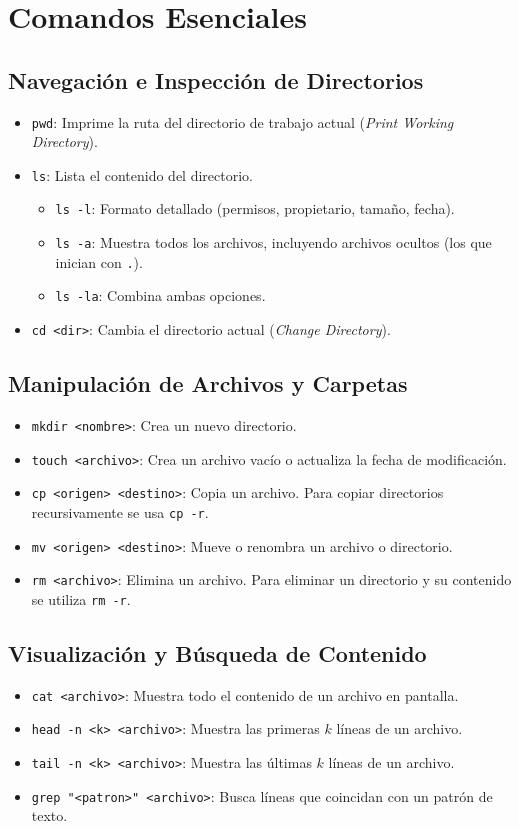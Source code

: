 \documentclass[12pt,a4paper]{article}
\begin{document}
\section{Comandos Esenciales}

\subsection{Navegación e Inspección de Directorios}
\begin{itemize}
    \item \texttt{pwd}: Imprime la ruta del directorio de trabajo actual (\textit{Print Working Directory}).
    \item \texttt{ls}: Lista el contenido del directorio.
    \begin{itemize}
        \item \texttt{ls -l}: Formato detallado (permisos, propietario, tamaño, fecha).
        \item \texttt{ls -a}: Muestra todos los archivos, incluyendo archivos ocultos (los que inician con \texttt{.}).
        \item \texttt{ls -la}: Combina ambas opciones.
    \end{itemize}
    \item \texttt{cd <dir>}: Cambia el directorio actual (\textit{Change Directory}).
\end{itemize}

\subsection{Manipulación de Archivos y Carpetas}
\begin{itemize}
    \item \texttt{mkdir <nombre>}: Crea un nuevo directorio.
    \item \texttt{touch <archivo>}: Crea un archivo vacío o actualiza la fecha de modificación.
    \item \texttt{cp <origen> <destino>}: Copia un archivo. Para copiar directorios recursivamente se usa \texttt{cp -r}.
    \item \texttt{mv <origen> <destino>}: Mueve o renombra un archivo o directorio.
    \item \texttt{rm <archivo>}: Elimina un archivo. Para eliminar un directorio y su contenido se utiliza \texttt{rm -r}.
\end{itemize}

\subsection{Visualización y Búsqueda de Contenido}
\begin{itemize}
    \item \texttt{cat <archivo>}: Muestra todo el contenido de un archivo en pantalla.
    \item \texttt{head -n <k> <archivo>}: Muestra las primeras $k$ líneas de un archivo.
    \item \texttt{tail -n <k> <archivo>}: Muestra las últimas $k$ líneas de un archivo.
    \item \texttt{grep "<patron>" <archivo>}: Busca líneas que coincidan con un patrón de texto.
\end{itemize}
\end{document}
